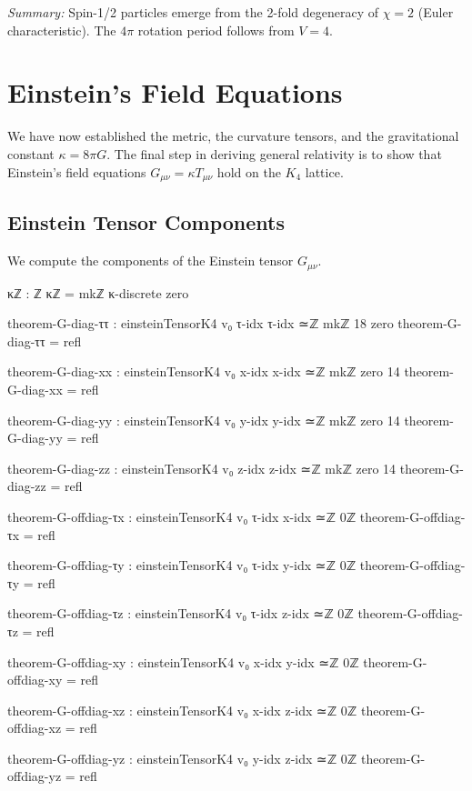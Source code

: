 \documentclass[11pt,a4paper]{book}
\begin{document}
\medskip
\noindent\textit{Summary:} Spin-1/2 particles emerge from the 2-fold degeneracy of $\chi = 2$ 
(Euler characteristic). The $4\pi$ rotation period follows from $V = 4$.

\chapter{Einstein's Field Equations}
\label{chap:einstein-equations}

We have now established the metric, the curvature tensors, and the gravitational constant 
$\kappa = 8\pi G$. The final step in deriving general relativity is to show that Einstein's 
field equations $G_{\mu\nu} = \kappa T_{\mu\nu}$ hold on the $K_4$ lattice.

\section{Einstein Tensor Components}

We compute the components of the Einstein tensor $G_{\mu\nu}$.

\begin{code}
κℤ : ℤ
κℤ = mkℤ κ-discrete zero

theorem-G-diag-ττ : einsteinTensorK4 v₀ τ-idx τ-idx ≃ℤ mkℤ 18 zero
theorem-G-diag-ττ = refl

theorem-G-diag-xx : einsteinTensorK4 v₀ x-idx x-idx ≃ℤ mkℤ zero 14
theorem-G-diag-xx = refl

theorem-G-diag-yy : einsteinTensorK4 v₀ y-idx y-idx ≃ℤ mkℤ zero 14
theorem-G-diag-yy = refl

theorem-G-diag-zz : einsteinTensorK4 v₀ z-idx z-idx ≃ℤ mkℤ zero 14
theorem-G-diag-zz = refl

theorem-G-offdiag-τx : einsteinTensorK4 v₀ τ-idx x-idx ≃ℤ 0ℤ
theorem-G-offdiag-τx = refl

theorem-G-offdiag-τy : einsteinTensorK4 v₀ τ-idx y-idx ≃ℤ 0ℤ
theorem-G-offdiag-τy = refl

theorem-G-offdiag-τz : einsteinTensorK4 v₀ τ-idx z-idx ≃ℤ 0ℤ
theorem-G-offdiag-τz = refl

theorem-G-offdiag-xy : einsteinTensorK4 v₀ x-idx y-idx ≃ℤ 0ℤ
theorem-G-offdiag-xy = refl

theorem-G-offdiag-xz : einsteinTensorK4 v₀ x-idx z-idx ≃ℤ 0ℤ
theorem-G-offdiag-xz = refl

theorem-G-offdiag-yz : einsteinTensorK4 v₀ y-idx z-idx ≃ℤ 0ℤ
theorem-G-offdiag-yz = refl
\end{code}
\end{document}
